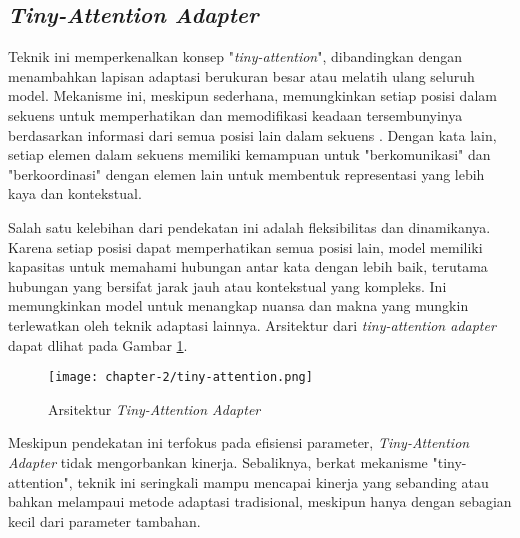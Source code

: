 \subsection{\textit{Tiny-Attention Adapter}}

Teknik ini memperkenalkan konsep "\textit{tiny-attention}", dibandingkan dengan menambahkan lapisan adaptasi berukuran besar atau melatih ulang seluruh model. Mekanisme ini, meskipun sederhana, memungkinkan setiap posisi dalam sekuens untuk memperhatikan dan memodifikasi keadaan tersembunyinya berdasarkan informasi dari semua posisi lain dalam sekuens \parencite{tinyattention}. Dengan kata lain, setiap elemen dalam sekuens memiliki kemampuan untuk "berkomunikasi" dan "berkoordinasi" dengan elemen lain untuk membentuk representasi yang lebih kaya dan kontekstual.

Salah satu kelebihan dari pendekatan ini adalah fleksibilitas dan dinamikanya. Karena setiap posisi dapat memperhatikan semua posisi lain, model memiliki kapasitas untuk memahami hubungan antar kata dengan lebih baik, terutama hubungan yang bersifat jarak jauh atau kontekstual yang kompleks. Ini memungkinkan model untuk menangkap nuansa dan makna yang mungkin terlewatkan oleh teknik adaptasi lainnya. Arsitektur dari \textit{tiny-attention adapter} dapat dlihat pada Gambar \ref{fig:tiny-attention}.

\begin{figure}[ht]
    \centering
    \texttt{[image: chapter-2/tiny-attention.png]}
    \caption{Arsitektur \textit{Tiny-Attention Adapter} \parencite{tinyattention}}
    \label{fig:tiny-attention}
\end{figure}


Meskipun pendekatan ini terfokus pada efisiensi parameter, \textit{Tiny-Attention Adapter} tidak mengorbankan kinerja. Sebaliknya, berkat mekanisme "tiny-attention", teknik ini seringkali mampu mencapai kinerja yang sebanding atau bahkan melampaui metode adaptasi tradisional, meskipun hanya dengan sebagian kecil dari parameter tambahan.